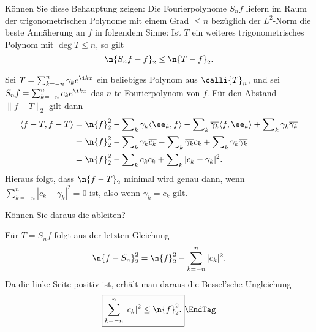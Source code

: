   \begin{frage}
    Können Sie diese Behauptung zeigen:    
    Die Fourierpolynome $S_nf$ liefern im Raum der trigonometrischen Polynome 
    mit einem Grad $\le n$ bezüglich der $L^2$-Norm 
    die beste Annäherung an $f$ in folgendem Sinne: 
    Ist $T$ ein weiteres trigonometrisches Polynom mit $\deg T \le n$, so gilt
    \begin{equation}\label{min}
      \n{ S_nf - f }_2 \le \n{ T-f }_2.
      \notag
    \end{equation}     
  \end{frage}

  \begin{antwort}
    Sei $T=\sum_{k=-n}^n \gamma_k e^{\i kx}$ ein beliebiges 
    Polynom aus $\calli{T}_n$, und sei 
    $S_n f= \sum_{k=-n}^n c_k e^{\i kx}$ das $n$-te Fourierpolynom von $f$. 
    Für den Abstand $\|f-T\|_2$ gilt dann  
    \begin{align*}
      \langle f-T, f-T \rangle &= 
      \n{ f }_2^2 - \sum\nolimits_k \gamma_k \langle \ee_k, f \rangle - 
      \sum\nolimits_k \overline{\gamma_k} \langle f, \ee_k \rangle +
      \sum\nolimits_k \gamma_k \overline{\gamma_k} \\
      &=
      \n{ f }_2^2 - \sum\nolimits_k \gamma_k \overline{c_k} -
      \sum\nolimits_k \overline{\gamma_k} c_k +
      \sum\nolimits_k \gamma_k \overline{\gamma_k} \\
      &=
      \n{ f }_2^2 - \sum\nolimits_k c_k \overline{c_k} + 
      \sum\nolimits_k | c_k-\gamma_k |^2.
    \end{align*}
    Hieraus folgt, dass $\n{ f-T }_2$ minimal wird genau dann, wenn 
    $\sum_{k=-n}^n | c_k -\gamma_k |^2=0$ ist, also wenn 
    $\gamma_k =c_k$ gilt.\AntEnd
  \end{antwort}

  \begin{frage}\label{07_bessel}
    Können Sie daraus die  ableiten?
  \end{frage}

  \begin{antwort}
    Für $T=S_n f$ folgt aus der letzten Gleichung
    \begin{equation}
      \n{ f-S_n }_2^2 = \n{ f }_2^2 - \sum_{k=-n}^n |c_k|^2. 
      \notag
    \end{equation}
    Da die linke Seite positiv ist, erhält man daraus die Bessel'sche 
    Ungleichung 
    \begin{equation}
      \boxed{
        \sum_{k=-n}^n |c_k|^2 \le \n{ f }^2_2. 
      }
      \EndTag
    \end{equation}
  \end{antwort}


